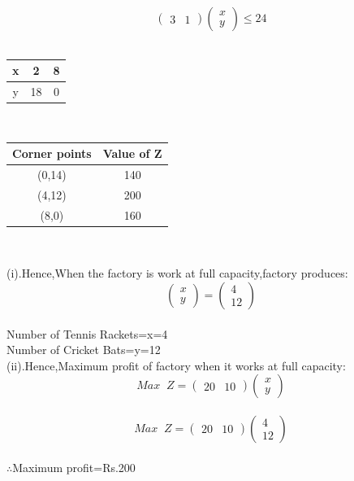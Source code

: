 \documentclass[10pt, a4paper]{article}
\newcommand{\myvec}[1]{\ensuremath{\begin{pmatrix}#1\end{pmatrix}}}
\begin{document}
\begin{equation}
\myvec{3&1}\myvec{x\\y}\le 24
\end{equation}\\
\begin{center}
\begin{tabular}{|c|c|c|}
	\hline
	x&2&8\\
	\hline
	y&18&0\\
	\hline
\end{tabular}\\
\end{center} 
\begin{center}
\begin{tabular}{|c|c|}
	\hline
	\textbf{Corner points}&\textbf{Value of Z}\\
	\hline
	(0,14)&140\\
    \hline
	(4,12)&200\\
	\hline
	(8,0)&160\\
	\hline
\end{tabular}\\

\end{center}
(i).Hence,When the factory is work at full capacity,factory produces:\\
\begin{equation}
\myvec{x\\y}=\myvec{4\\12}
\end{equation}\\
Number of Tennis Rackets=x=4\\
Number of Cricket Bats=y=12\\
(ii).Hence,Maximum profit of factory when it works at full capacity:\\
\begin{equation}
Max \;\;Z=\myvec{20&10}\myvec{x\\y}
\end{equation}\\
\begin{equation}
Max \;\;Z=\myvec{20&10}\myvec{4\\12}
\end{equation}\\
$\therefore$Maximum profit=Rs.200\\
\end{document}
